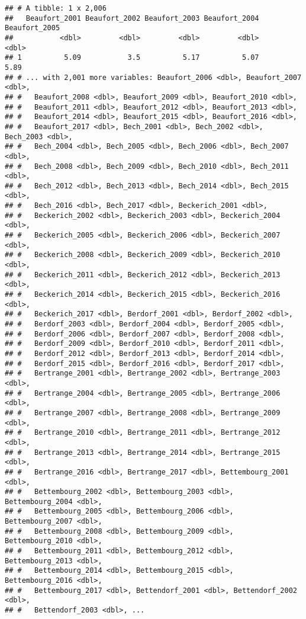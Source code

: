\documentclass[
]{article}
\begin{document}
\begin{verbatim}
## # A tibble: 1 x 2,006
##   Beaufort_2001 Beaufort_2002 Beaufort_2003 Beaufort_2004 Beaufort_2005
##           <dbl>         <dbl>         <dbl>         <dbl>         <dbl>
## 1          5.09           3.5          5.17          5.07          5.89
## # ... with 2,001 more variables: Beaufort_2006 <dbl>, Beaufort_2007 <dbl>,
## #   Beaufort_2008 <dbl>, Beaufort_2009 <dbl>, Beaufort_2010 <dbl>,
## #   Beaufort_2011 <dbl>, Beaufort_2012 <dbl>, Beaufort_2013 <dbl>,
## #   Beaufort_2014 <dbl>, Beaufort_2015 <dbl>, Beaufort_2016 <dbl>,
## #   Beaufort_2017 <dbl>, Bech_2001 <dbl>, Bech_2002 <dbl>, Bech_2003 <dbl>,
## #   Bech_2004 <dbl>, Bech_2005 <dbl>, Bech_2006 <dbl>, Bech_2007 <dbl>,
## #   Bech_2008 <dbl>, Bech_2009 <dbl>, Bech_2010 <dbl>, Bech_2011 <dbl>,
## #   Bech_2012 <dbl>, Bech_2013 <dbl>, Bech_2014 <dbl>, Bech_2015 <dbl>,
## #   Bech_2016 <dbl>, Bech_2017 <dbl>, Beckerich_2001 <dbl>,
## #   Beckerich_2002 <dbl>, Beckerich_2003 <dbl>, Beckerich_2004 <dbl>,
## #   Beckerich_2005 <dbl>, Beckerich_2006 <dbl>, Beckerich_2007 <dbl>,
## #   Beckerich_2008 <dbl>, Beckerich_2009 <dbl>, Beckerich_2010 <dbl>,
## #   Beckerich_2011 <dbl>, Beckerich_2012 <dbl>, Beckerich_2013 <dbl>,
## #   Beckerich_2014 <dbl>, Beckerich_2015 <dbl>, Beckerich_2016 <dbl>,
## #   Beckerich_2017 <dbl>, Berdorf_2001 <dbl>, Berdorf_2002 <dbl>,
## #   Berdorf_2003 <dbl>, Berdorf_2004 <dbl>, Berdorf_2005 <dbl>,
## #   Berdorf_2006 <dbl>, Berdorf_2007 <dbl>, Berdorf_2008 <dbl>,
## #   Berdorf_2009 <dbl>, Berdorf_2010 <dbl>, Berdorf_2011 <dbl>,
## #   Berdorf_2012 <dbl>, Berdorf_2013 <dbl>, Berdorf_2014 <dbl>,
## #   Berdorf_2015 <dbl>, Berdorf_2016 <dbl>, Berdorf_2017 <dbl>,
## #   Bertrange_2001 <dbl>, Bertrange_2002 <dbl>, Bertrange_2003 <dbl>,
## #   Bertrange_2004 <dbl>, Bertrange_2005 <dbl>, Bertrange_2006 <dbl>,
## #   Bertrange_2007 <dbl>, Bertrange_2008 <dbl>, Bertrange_2009 <dbl>,
## #   Bertrange_2010 <dbl>, Bertrange_2011 <dbl>, Bertrange_2012 <dbl>,
## #   Bertrange_2013 <dbl>, Bertrange_2014 <dbl>, Bertrange_2015 <dbl>,
## #   Bertrange_2016 <dbl>, Bertrange_2017 <dbl>, Bettembourg_2001 <dbl>,
## #   Bettembourg_2002 <dbl>, Bettembourg_2003 <dbl>, Bettembourg_2004 <dbl>,
## #   Bettembourg_2005 <dbl>, Bettembourg_2006 <dbl>, Bettembourg_2007 <dbl>,
## #   Bettembourg_2008 <dbl>, Bettembourg_2009 <dbl>, Bettembourg_2010 <dbl>,
## #   Bettembourg_2011 <dbl>, Bettembourg_2012 <dbl>, Bettembourg_2013 <dbl>,
## #   Bettembourg_2014 <dbl>, Bettembourg_2015 <dbl>, Bettembourg_2016 <dbl>,
## #   Bettembourg_2017 <dbl>, Bettendorf_2001 <dbl>, Bettendorf_2002 <dbl>,
## #   Bettendorf_2003 <dbl>, ...
\end{verbatim}
\end{document}
